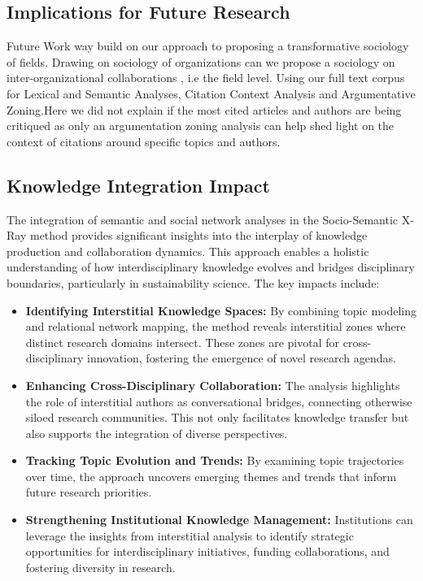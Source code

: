 \documentclass[12pt]{article}
\begin{document}
\subsection{Implications for Future Research}
Future Work way build on our approach to proposing a transformative sociology of fields. Drawing on sociology of organizations can we propose a sociology on inter-organizational collaborations , i.e the field level. Using our full text corpus for Lexical and Semantic Analyses, Citation Context Analysis and Argumentative Zoning.Here we did not explain if the most cited articles and authors are being critiqued as only an argumentation zoning analysis can help shed light on the context of citations around specific topics and authors.

\subsection{Knowledge Integration Impact}
The integration of semantic and social network analyses in the Socio-Semantic X-Ray method provides significant insights into the interplay of knowledge production and collaboration dynamics. This approach enables a holistic understanding of how interdisciplinary knowledge evolves and bridges disciplinary boundaries, particularly in sustainability science. The key impacts include:

\begin{itemize}
    \item \textbf{Identifying Interstitial Knowledge Spaces:} By combining topic modeling and relational network mapping, the method reveals interstitial zones where distinct research domains intersect. These zones are pivotal for cross-disciplinary innovation, fostering the emergence of novel research agendas.
    \item \textbf{Enhancing Cross-Disciplinary Collaboration:} The analysis highlights the role of interstitial authors as conversational bridges, connecting otherwise siloed research communities. This not only facilitates knowledge transfer but also supports the integration of diverse perspectives.
    \item \textbf{Tracking Topic Evolution and Trends:} By examining topic trajectories over time, the approach uncovers emerging themes and trends that inform future research priorities.
    \item \textbf{Strengthening Institutional Knowledge Management:} Institutions can leverage the insights from interstitial analysis to identify strategic opportunities for interdisciplinary initiatives, funding collaborations, and fostering diversity in research.
\end{itemize}
\end{document}
